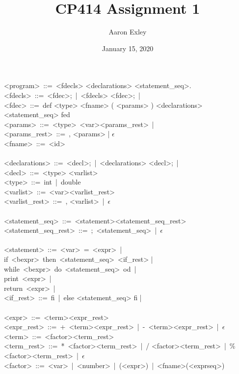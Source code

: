\documentclass{article}
\title{CP414 Assignment 1}
\date{January 15, 2020}
\author{Aaron Exley}
\begin{document}
\maketitle
\noindent
<program>\ ::=\ <fdecls> <declarations> <statement\_seq>.\\
<fdecls>\ ::=\ <fdec>;\ |\ <fdecls> <fdec>;\ |\\
<fdec>\ ::=\ def <type> <fname> ( <params> ) <declarations> <statement\_seq> fed\\
<params>\ ::=\ <type>\ <var><params\_rest>\ |\\
<params\_rest>\ ::=\ , <params> | $\epsilon$ \\
<fname>\ ::=\ <id>\\
\\
<declarations>\ ::=\ <decl>;\ |\ <declarations> <decl>;\ |\\
<decl>\ ::=\ <type> <varlist>\\
<type>\ ::=\ int\ |\ double\\
<varlist>\ ::=\ <var><varlist\_rest>\\
<varlist\_rest>\ ::=\ , <varlist>\ |\ $\epsilon$\\
\\
<statement\_seq>\ ::=\ <statement><statement\_seq\_rest>\\
<statement\_seq\_rest>\ ::=\ ;\ <statement\_seq>\ |\ $\epsilon$\\
\\
<statement>\ ::=\ <var>\ =\ <expr>\ |\\
\null\qquad\qquad\qquad\qquad if\ <bexpr>\ then\ <statement\_seq>\ <if\_rest> |\\
\null\qquad\qquad\qquad\qquad while\ <bexpr>\ do\ <statement\_seq>\ od\ |\\
\null\qquad\qquad\qquad\qquad print\ <expr>\ |\\
\null\qquad\qquad\qquad\qquad return\ <expr>\ |\\
<if\_rest>\ ::=\ fi\ |\ else <statement\_seq> fi |\\
\\
<expr>\ ::=\ <term><expr\_rest>\\
<expr\_rest>\ ::=\ +\ <term><expr\_rest>\ |\ -\ <term><expr\_rest>\ |\ $\epsilon$\\
<term>\ ::=\ <factor><term\_rest>\\
<term\_rest>\ ::=\ *\ <factor><term\_rest>\ |\ / <factor><term\_rest>\ |\ \% <factor><term\_rest>\ |\ $\epsilon$\\
<factor>\ ::=\ <var>\ |\ <number>\ |\ (<expr>)\ |\ <fname>(<exprseq>)\\
\end{document}
